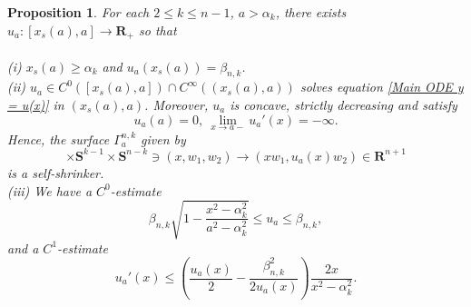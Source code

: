 \documentclass[pdflatex,sn-mathphys-num]{sn-jnl}
\newtheorem{proposition}[theorem]{Proposition}
\begin{document}
\begin{proposition}\label{Existence of caps}
    For each $2 \leq k \leq n-1$, $a > \alpha_k$, there exists $u_a : [x_{s}(a), a] \to \mathbf{R}_+$ so that\\\\
    (i) $x_{s}(a) \geq \alpha_k$ and $u_a(x_{s}(a)) = \beta_{n,k}$. \\
    (ii) $u_{a} \in C^0([x_{s}(a), a]) \cap C^{\infty}((x_{s}(a), a))$ solves equation \eqref{Main ODE y = u(x)} in $(x_{s}(a), a)$. Moreover, $u_a$ is concave, strictly decreasing and satisfy
\begin{equation}
    u_a(a) = 0, \ \lim_{x \to a-}u_{a}'(x) = -\infty.
\end{equation}
Hence, the surface $\Gamma^{n,k}_a$ given by
\begin{equation}
    [x_s(a), a]\times \mathbf{S}^{k-1}\times \mathbf{S}^{n-k} \ni (x, w_1, w_2) \to (xw_1, u_a(x)w_2) \in  \mathbf{R}^{n+1}
\end{equation}
is a self-shrinker.\\
(iii) 
We have a $C^0$-estimate
\begin{equation}\label{C0 estimate for caps in proposisition 4.1}
    \beta_{n,k}\sqrt{1 - \frac{x^2 - \alpha_k^2}{a^2 - \alpha_k^2}} \leq u_a \leq \beta_{n,k},
\end{equation}
and a $C^1$-estimate
\begin{equation}\label{C1 estimate for caps in proposisition 4.1}
     u_a'(x) \leq  (\frac{u_a(x)}{2} - \frac{\beta_{n,k}^2}{2u_a(x)})\frac{2x}{x^2 - \alpha_k^2}.
\end{equation}
\end{proposition}
\end{document}
